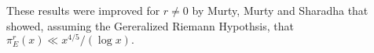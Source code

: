 \documentclass[a4paper,10pt]{article}
\newcommand{\Q}{\mathbb{Q}}
\begin{document}
These results were improved for $r\ne0$ by Murty, Murty and Sharadha \cite{MMS} that showed, assuming the Gereralized Riemann Hypothsis, that
$\pi_E^r(x)\ll x^{4/5}/(\log x).$

% 
% 
% 
% 
\end{document}

